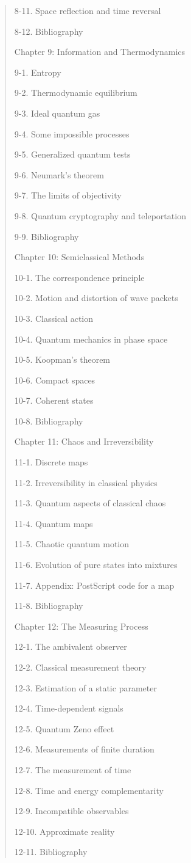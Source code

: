 \documentclass{article}
\begin{document}
\begin{quote}
{8-11. Space reflection and time reversal 

8-12. Bibliography 

Chapter 9: Information and Thermodynamics

9-1. Entropy 

9-2. Thermodynamic equilibrium 

9-3. Ideal quantum gas 

9-4. Some impossible processes 

9-5. Generalized quantum tests 

9-6. Neumark's theorem 

9-7. The limits of objectivity 

9-8. Quantum cryptography and teleportation 

9-9. Bibliography 

Chapter 10: Semiclassical Methods

10-1. The correspondence principle 

10-2. Motion and distortion of wave packets 

10-3. Classical action 

10-4. Quantum mechanics in phase space 

10-5. Koopman's theorem 

10-6. Compact spaces 

10-7. Coherent states 

10-8. Bibliography 

Chapter 11: Chaos and Irreversibility

11-1. Discrete maps 

11-2. Irreversibility in classical physics 

11-3. Quantum aspects of classical chaos 

11-4. Quantum maps 

11-5. Chaotic quantum motion 

11-6. Evolution of pure states into mixtures 

11-7. Appendix: PostScript code for a map 

11-8. Bibliography 

Chapter 12: The Measuring Process

12-1. The ambivalent observer 

12-2. Classical measurement theory 

12-3. Estimation of a static parameter 

12-4. Time-dependent signals 

12-5. Quantum Zeno effect 

12-6. Measurements of finite duration 

12-7. The measurement of time 

12-8. Time and energy complementarity 

12-9. Incompatible observables 

12-10. Approximate reality 

12-11. Bibliography
}
\end{quote}
\end{document}
